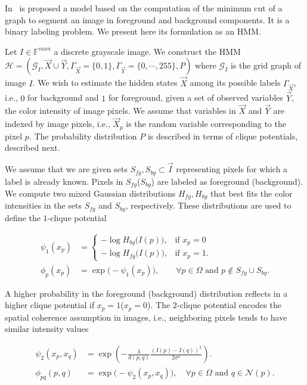 In~\cite{boykov01graphcut} is proposed a model based on the computation of the minimum cut of a graph to segment an image in foreground and background components. It is a binary labeling problem. We present here its formulation as an HMM.

Let $I \in \mathbb{F}^{mxn}$ a discrete grayscale image. We construct the HMM $\mathcal{H} = (\mathcal{G}_I,\vec{X} \cup \vec{Y},\Gamma_{\vec{X}}=\{0,1\}, \Gamma_{\vec{Y}}=\{0,\cdots,255\},P)$ where $\mathcal{G}_I$ is the grid graph of image $I$. We wish to estimate the hidden states $\vec{X}$ among its possible labels $\Gamma_{\vec{X}}$, i.e., $0$ for background and $1$ for foreground, given a set of observed variables $\vec{Y}$, the color intensity of image pixels. We assume that variables in $\vec{X}$ and $\vec{Y}$ are indexed by image pixels, i.e., $\vec{X}_p$ is the random variable corresponding to the pixel $p$. The probability distribution $P$ is described in terms of clique potentials, described next.  

We assume that we are given sets $S_{fg},S_{bg} \subset \vec{I}$ representing pixels for which a label is already known. Pixels in $S_{fg}$($S_{bg}$) are labeled as foreground (background). We compute two mixed Gaussian distributions $H_{fg},H_{bg}$ that best fits the color intensities in the sets $S_{fg}$ and $S_{bg}$, respectively. These distributions are used to define the $1$-clique potential

\begin{align*}
	\psi_1(x_p) &= \left\{ \begin{array}{ll}
	-\log  H_{bg}\big( I(p) \big), & \text{if } x_p=0  \\[1em]	
	-\log  H_{fg}\big( I(p) \big), & \text{if } x_p=1 .
	\end{array}\right.\\[1em]
	\phi_p(x_p) &= \exp{ \big(- \psi_1(x_p) \big) },\quad \quad \forall p \in \Omega \text{ and } p \notin S_{fg} \cup S_{bg}.
\end{align*}

A higher probability in the foreground (background) distribution reflects in a higher clique potential if $x_p=1$($x_p=0$). The $2$-clique potential encodes the spatial coherence assumption in images, i.e., neighboring pixels tends to have similar intensity values

\begin{align*}
	\psi_{2}(x_p,x_q) &= \exp{ \left( - \frac{\lambda}{d(p,q)}\frac{(I(p) - I(q))^2}{2\sigma^2} \right) }.\\[1em]
	\phi_{pq}(p,q) &= \exp{ \big( -\psi_{2}(x_p,x_q) \big) }, \quad \forall p \in \Omega \text{ and } q \in \mathcal{N}(p).
\end{align*}

